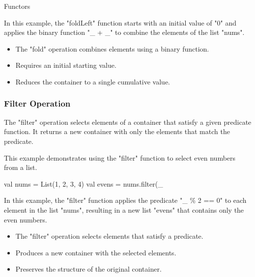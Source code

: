 \begin{notes}{Functors}
\begin{highlight}
    In this example, the "foldLeft" function starts with an initial value of "0" and applies the binary function "\_ + \_" to combine the elements of the list "nums".
        
        \begin{itemize}
            \item The "fold" operation combines elements using a binary function.
            \item Requires an initial starting value.
            \item Reduces the container to a single cumulative value.
        \end{itemize}
    
    \end{highlight}
    
    \subsubsection*{Filter Operation}
    
    The "filter" operation selects elements of a container that satisfy a given predicate function. It returns a new container with only the elements that match the predicate.
    
    \begin{highlight}
    
        This example demonstrates using the "filter" function to select even numbers from a list.
    
    \begin{code}[Scala]
    val nums = List(1, 2, 3, 4)
    val evens = nums.filter(_ %
    \end{code}
    
        In this example, the "filter" function applies the predicate "\_ \% 2 == 0" to each element in the list "nums", resulting in a new list "evens" that contains only the even numbers.
        
        \begin{itemize}
            \item The "filter" operation selects elements that satisfy a predicate.
            \item Produces a new container with the selected elements.
            \item Preserves the structure of the original container.
        \end{itemize}
    
    \end{highlight}
    

\end{notes}
